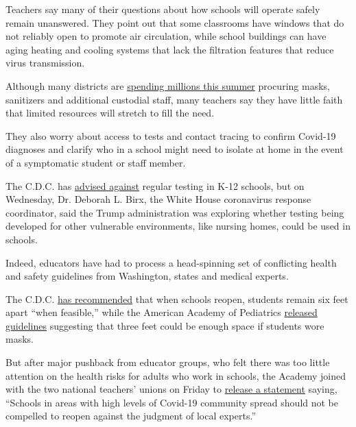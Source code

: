 Teachers say many of their questions about how schools will operate
safely remain unanswered. They point out that some classrooms have
windows that do not reliably open to promote air circulation, while
school buildings can have aging heating and cooling systems that lack
the filtration features that reduce virus transmission.

Although many districts are
\href{https://www.nytimes3xbfgragh.onion/2020/07/09/us/schools-reopening-trump.html?smid=tw-share}{spending
millions this summer} procuring masks, sanitizers and additional
custodial staff, many teachers say they have little faith that limited
resources will stretch to fill the need.

They also worry about access to tests and contact tracing to confirm
Covid-19 diagnoses and clarify who in a school might need to isolate at
home in the event of a symptomatic student or staff member.

The C.D.C. has
\href{https://www.cdc.gov/coronavirus/2019-ncov/community/schools-childcare/k-12-testing.html}{advised
against} regular testing in K-12 schools, but on Wednesday, Dr. Deborah
L. Birx, the White House coronavirus response coordinator, said the
Trump administration was exploring whether testing being developed for
other vulnerable environments, like nursing homes, could be used in
schools.

Indeed, educators have had to process a head-spinning set of conflicting
health and safety guidelines from Washington, states and medical
experts.

The C.D.C.
\href{https://www.cdc.gov/coronavirus/2019-ncov/community/schools-childcare/schools.html}{has
recommended} that when schools reopen, students remain six feet apart
``when feasible,'' while the American Academy of Pediatrics
\href{https://www.nytimes3xbfgragh.onion/2020/06/30/us/coronavirus-schools-reopening-guidelines-aap.html}{released
guidelines} suggesting that three feet could be enough space if students
wore masks.

But after major pushback from educator groups, who felt there was too
little attention on the health risks for adults who work in schools, the
Academy joined with the two national teachers' unions on Friday to
\href{https://services.aap.org/en/news-room/news-releases/aap/2020/pediatricians-educators-and-superintendents-urge-a-safe-return-to-school-this-fall/}{release
a statement} saying, ``Schools in areas with high levels of Covid-19
community spread should not be compelled to reopen against the judgment
of local experts.''

